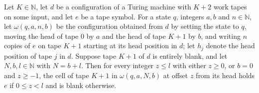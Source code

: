 \begin{lemma}
\label{Turing.cw_skip_word}
\leanok
{}
Let $K\in\mathbb{N}$, let $d$ be a configuration of a Turing machine with $K+2$ work tapes on
some input, and let $e$ be a tape symbol. For a state $q$, integers $a,b$ and $n\in\mathbb{N}$,
let $\omega(q,a,n,b)$ be the configuration obtained from $d$ by setting the state to $q$,
moving the head of tape $0$ by $a$ and the head of tape $K+1$ by $b$, and writing $n$ copies of
$e$ on tape $K+1$ starting at its head position in $d$; let $h_j$ denote the head position of
tape $j$ in $d$. Suppose tape $K+1$ of $d$ is entirely blank, and let $N,b,l\in\mathbb{N}$ with
$N=b+l$. Then for every integer $z\le l$ with either $z\ge 0$, or $b=0$ and $z\ge -1$, the cell
of tape $K+1$ in $\omega(q,a,N,b)$ at offset $z$ from its head holds $e$ if $0\le z<l$ and is
blank otherwise.
\end{lemma}

